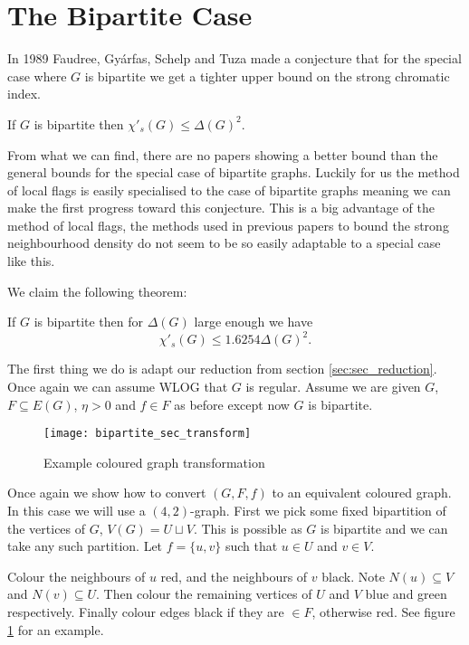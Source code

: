\section{The Bipartite Case}
\label{sec:sec_bipartite}

In 1989 Faudree, Gyárfas, Schelp and Tuza
made a conjecture that for the special case where $G$ is bipartite we get a tighter
upper bound on the strong chromatic index.

\begin{knownconjecture}
    If $G$ is bipartite then $\chi'_s(G) \leq \Delta(G)^2$.
\end{knownconjecture}

From what we can find, there are no papers showing a better bound than the general
bounds for the special case of bipartite graphs. Luckily for us the method of local flags
is easily specialised to the case of bipartite graphs meaning we can make the first
progress toward this conjecture. This is a big advantage of the method of local flags,
the methods used in previous papers to bound the strong neighbourhood density do not seem
to be so easily adaptable to a special case like this.

We claim the following theorem:
\begin{theorem}
    \label{thm:sec_bipartite_bound}
    If $G$ is bipartite then for $\Delta(G)$ large enough we have
    \[\chi'_s(G) \leq 1.6254\Delta(G)^2.\]
\end{theorem}

The first thing we do is adapt our reduction from section \ref{sec:sec_reduction}. Once
again we can assume WLOG that $G$ is regular. Assume we are given
$G$, $F \subseteq E(G)$, $\eta > 0$ and $f\in F$ as before except now $G$ is bipartite.

\begin{figure}[ht]
    \centering
    \texttt{[image: bipartite\_sec\_transform]}
    \caption{Example coloured graph transformation}
    \label{fig:bipartite_sec_transform}
\end{figure}

Once again we show how to convert $(G,F,f)$ to an equivalent coloured graph. In this case
we will use a $(4, 2)$-graph. First we pick some fixed bipartition of the vertices
of $G$, $V(G) = U \sqcup V$. This is possible as $G$ is bipartite and we can take any
such partition. Let $f=\{u,v\}$ such that $u\in U$ and $v\in V$.

Colour the neighbours of $u$ red, and the neighbours of $v$ black. Note
$N(u) \subseteq V$ and $N(v)\subseteq U$. Then colour the remaining vertices of
$U$ and $V$ blue and green respectively. Finally colour edges black if they are
$\in F$, otherwise red. See figure \ref{fig:bipartite_sec_transform} for an example.

